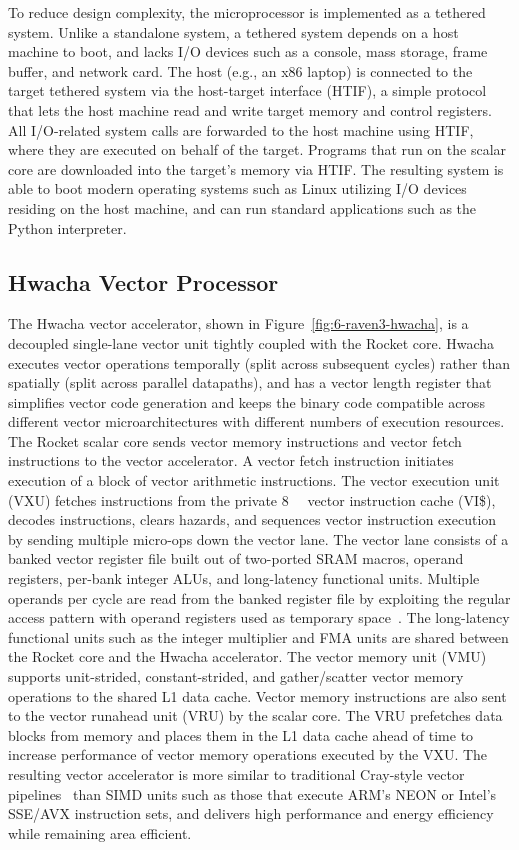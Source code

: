 \documentclass[graybox]{svmult}
\begin{document}
To reduce design complexity, the microprocessor is implemented as a tethered system.
Unlike a standalone system, a tethered system depends on a host machine to boot, and lacks I/O devices such as a console, mass storage, frame buffer, and network card.
The host (e.g., an x86 laptop) is connected to the target tethered system via the host-target interface (HTIF), a simple protocol that lets the host machine read and write target memory and control registers.
All I/O-related system calls are forwarded to the host machine using HTIF, where they are executed on behalf of the target.
Programs that run on the scalar core are downloaded into the target's memory via HTIF.
The resulting system is able to boot modern operating systems such as Linux utilizing I/O devices residing on the host machine, and can run standard applications such as the Python interpreter.


\subsection{Hwacha Vector Processor}

The Hwacha vector accelerator, shown in Figure~\ref{fig:6-raven3-hwacha}, is a decoupled single-lane vector unit tightly coupled with the Rocket core.
Hwacha executes vector operations temporally (split across subsequent cycles) rather than spatially (split across parallel datapaths), and has a vector length register that simplifies vector code generation and keeps the binary code compatible across different vector microarchitectures with different numbers of execution resources.
The Rocket scalar core sends vector memory instructions and vector fetch instructions to the vector accelerator.
A vector fetch instruction initiates execution of a block of vector arithmetic instructions.
The vector execution unit (VXU) fetches instructions from the private \SI{8}{\kibi\byte} vector instruction cache (VI\$), decodes instructions, clears hazards, and sequences vector instruction execution by sending multiple micro-ops down the vector lane.
The vector lane consists of a banked vector register file built out of two-ported SRAM macros, operand registers, per-bank integer ALUs, and long-latency functional units.
Multiple operands per cycle are read from the banked register file by exploiting the regular access pattern with operand registers used as temporary space~\cite{Lee2014}.
The long-latency functional units such as the integer multiplier and FMA units are shared between the Rocket core and the Hwacha accelerator.
The vector memory unit (VMU) supports unit-strided, constant-strided, and gather/scatter vector memory operations to the shared L1 data cache.
Vector memory instructions are also sent to the vector runahead unit (VRU) by the scalar core.
The VRU prefetches data blocks from memory and places them in the L1 data cache ahead of time to increase performance of vector memory operations executed by the VXU.
The resulting vector accelerator is more similar to traditional Cray-style vector pipelines~\cite{Russel1978} than SIMD units such as those that execute ARM's NEON or Intel's SSE/AVX instruction sets, and delivers high performance and energy efficiency while remaining area efficient.
\end{document}
